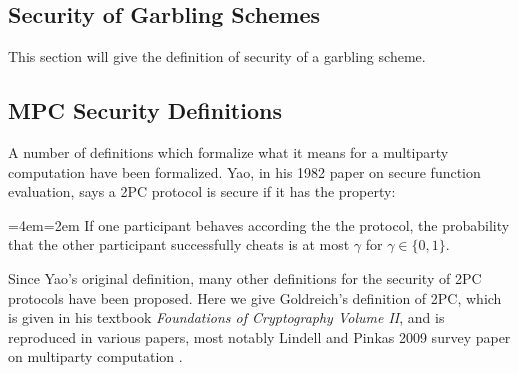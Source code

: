 \documentclass[12pt,twoside]{reedthesis}
\newenvironment{blockquote}{%
  \par%
  \medskip
  \leftskip=4em\rightskip=2em%
  \noindent\ignorespaces}{%
  \par\medskip}
\begin{document}
\subsection{Security of Garbling Schemes}
This section will give the definition of security of a garbling scheme.

\subsection{MPC Security Definitions}
A number of definitions which formalize what it means for a multiparty computation have been formalized. 
Yao, in his 1982 paper on secure function evaluation, says a 2PC protocol is secure if it has the property:

\begin{blockquote}
If one participant behaves according the the protocol, the probability that the other participant successfully cheats is at most $\gamma$ for $\gamma \in \{0,1\}$.
\end{blockquote}

Since Yao's original definition, many other definitions for the security of 2PC protocols have been proposed.
Here we give Goldreich's definition of 2PC, which is given in his textbook \textit{Foundations of Cryptography Volume II}, and is reproduced in various papers, most notably Lindell and Pinkas 2009 survey paper on multiparty computation \cite{goldreich2, lindell2009}.


\end{document}
